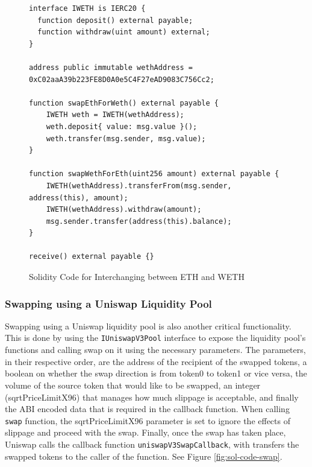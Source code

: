 \begin{figure}[htb!]
\begin{adjustwidth}{-0.5in}{-0.5in}
\begin{minipage}{\linewidth}
\centering
\begin{lstlisting}[language=Solidity]
interface IWETH is IERC20 {
  function deposit() external payable;
  function withdraw(uint amount) external;
}

address public immutable wethAddress = 0xC02aaA39b223FE8D0A0e5C4F27eAD9083C756Cc2;

function swapEthForWeth() external payable {
    IWETH weth = IWETH(wethAddress);
    weth.deposit{ value: msg.value }();
    weth.transfer(msg.sender, msg.value);
}

function swapWethForEth(uint256 amount) external payable {
    IWETH(wethAddress).transferFrom(msg.sender, address(this), amount);
    IWETH(wethAddress).withdraw(amount);
    msg.sender.transfer(address(this).balance);
}

receive() external payable {}
\end{lstlisting}
\end{minipage}
\end{adjustwidth}
\caption{Solidity Code for Interchanging between ETH and WETH \label{fig:sol-code-eth-weth}}
\end{figure}

\subsubsection{Swapping using a Uniswap Liquidity Pool}
Swapping using a Uniswap liquidity pool is also another critical functionality. This is done by using the \texttt{IUniswapV3Pool} interface to expose the liquidity pool's functions and calling swap on it using the necessary parameters. The parameters, in their respective order, are the address of the recipient of the swapped tokens, a boolean on whether the swap direction is from token0 to token1 or vice versa, the volume of the source token that would like to be swapped, an integer (sqrtPriceLimitX96) that manages how much slippage is acceptable, and finally the ABI encoded data that is required in the callback function. When calling \texttt{swap} function, the sqrtPriceLimitX96 parameter is set to ignore the effects of slippage and proceed with the swap. Finally, once the swap has taken place, Uniswap calls the callback function \texttt{uniswapV3SwapCallback}, with transfers the swapped tokens to the caller of the function. See Figure \ref{fig:sol-code-swap}.


